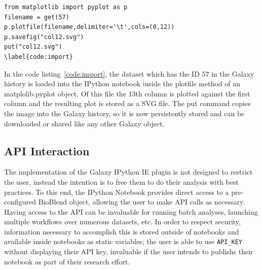 \documentclass{bioinfo}
\begin{document}
\begin{methods}
\begin{lstlisting}[frame=single]
from matplotlib import pyplot as p
filename = get(57)
p.plotfile(filename,delimiter='\t',cols=(0,12))
p.savefig("col12.svg")
put("col12.svg")
\label{code:import}
\end{lstlisting}
In the code listing~\ref{code:import}, the dataset which has the ID 57 in the Galaxy history is loaded into the IPython notebook inside the
plotfile method of an matplolib.pyplot object. Of this file the 13th column is plotted against the first column and the
resulting plot is stored as a SVG file. The put command copies the image into the Galaxy history, so it is now persistently
stored and can be downloaded or shared like any other Galaxy object.

\subsection{API Interaction}
The implementation of the Galaxy IPython IE plugin is not designed to restrict the user, instead the intention is to free
them to do their analysis with best practices. To this end, the IPython Notebook provides direct access to a pre-configured
BioBlend object, allowing the user to make API calls as necessary. Having access to the API can be invaluable for running
batch analyses, launching multiple workflows over numerous datasets, etc. In order to respect security, information necessary
to accomplish this is stored outside of notebooks and available inside notebooks as static variables; the user is able to use
\texttt{API\_KEY} without displaying their API key, invaluable if the user intends to publishs their notebook as
part of their research effort.

%
%
%
%
%
%
%
%
%
%



\end{methods}
\end{document}
